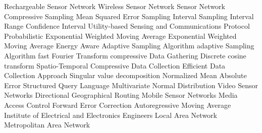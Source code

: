 \begin{acronym}[YTM]
   {Rechargeable Sensor Network}
   {Wireless Sensor Network}
    {Sensor Network}
    {Compressive Sampling}
   {Mean Squared Error}
    {Sampling Interval}
   {Sampling Interval Range}
    {Confidence Interval}
  {Utility-based Sensing and Communications Protocol}
 {Probabilistic Exponential Weighted Moving Average}
  {Exponential Weighted Moving Average}
  {Energy Aware Adaptive Sampling Algorithm}
   {adaptive Sampling Algorithm}
   {fast Fourier Transform}
   {compressive Data Gathering}
   {Discrete cosine transform}
 {Spatio-Temporal Compressive Data Collection}
  {Efficient Data Collection Approach}
   {Singular value decomposition}
  {Normalized Mean Absolute Error}
   {Structured Query Language}
   {Multivariate Normal Distribution}
   {Video Sensor Networks}
   {Directional Geographical Routing}
   {Mobile Sensor Networks}
   {Media Access Control}
   {Forward Error Correction}
  {Autoregressive Moving Average}
  {Institute of Electrical and Electronics Engineers}
   {Local Area Network}
   {Metropolitan Area Network}
\end{acronym}